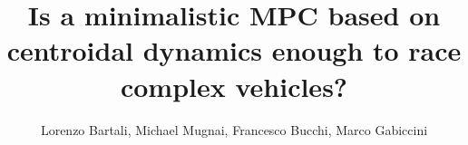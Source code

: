 \documentclass[conference]{IEEEtran} %
\begin{document}
\title{Is a minimalistic MPC based on centroidal dynamics enough to race complex vehicles?}

\author{Lorenzo Bartali, Michael Mugnai, Francesco Bucchi, Marco Gabiccini}





%


\maketitle
\end{document}
